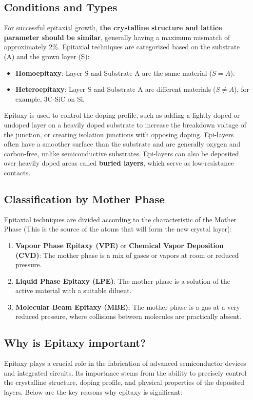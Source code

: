 \documentclass{report}
\begin{document}
\subsection{Conditions and Types}
For successful epitaxial growth, \textbf{the crystalline structure and lattice parameter should be similar}, generally having a maximum mismatch of approximately $2\%$.
Epitaxial techniques are categorized based on the substrate (A) and the grown layer (S):
\begin{itemize}
    \item \textbf{Homoepitaxy}: Layer S and Substrate A are the same material ($S=A$).
    \item \textbf{Heteroepitaxy}: Layer S and Substrate A are different materials ($S\ne A$), for example, 3C-SiC on Si.
\end{itemize}

Epitaxy is used to control the doping profile, such as adding a lightly doped or undoped layer on a heavily doped substrate to increase the breakdown voltage of the junction, or creating isolation junctions with opposing doping. Epi-layers often have a smoother surface than the substrate and are generally oxygen and carbon-free, unlike semiconductive substrates. Epi-layers can also be deposited over heavily doped areas called \textbf{buried layers}, which serve as low-resistance contacts.

\subsection{Classification by Mother Phase}
Epitaxial techniques are divided according to the characteristic of the Mother Phase (This is the source of the atoms that will form the new crystal layer):

\begin{enumerate}
    \item \textbf{Vapour Phase Epitaxy (VPE)} or \textbf{Chemical Vapor Deposition (CVD)}: The mother phase is a mix of gases or vapors at room or reduced pressure.
    \item \textbf{Liquid Phase Epitaxy (LPE)}: The mother phase is a solution of the active material with a suitable diluent.
    \item \textbf{Molecular Beam Epitaxy (MBE)}: The mother phase is a gas at a very reduced pressure, where collisions between molecules are practically absent.
\end{enumerate}
\subsection{Why is Epitaxy important?}
Epitaxy plays a crucial role in the fabrication of advanced semiconductor devices and integrated circuits. Its importance stems from the ability to precisely control the crystalline structure, doping profile, and physical properties of the deposited layers. Below are the key reasons why epitaxy is significant:
\end{document}
